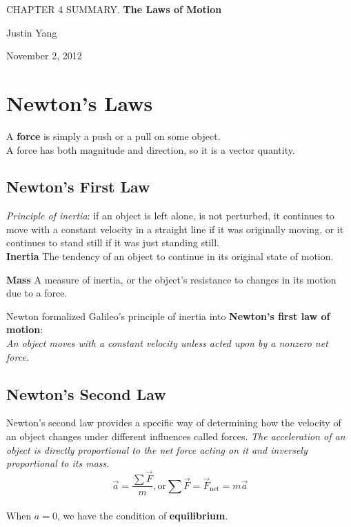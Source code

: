 \documentclass[11pt,a4paper]{report}
\begin{document}
\setcounter{secnumdepth}{0}
\begin{center}
\Large{CHAPTER 4 SUMMARY. \textbf{The Laws of Motion}}

\large{Justin Yang}

November 2, 2012
\end{center}

\section{Newton's Laws}
A \textbf{force} is simply a push or a pull on some object.\\A force has both magnitude and direction, so it is a vector quantity.

\subsection{Newton's First Law}
\textit{Principle of inertia}: if an object is left alone, is not perturbed, it continues to move with a constant velocity in a straight line if it was originally moving, or it continues to stand still if it was just standing still.
\\\textbf{Inertia} The tendency of an object to continue in its original state of motion.

\hspace{1mm}

\noindent
\textbf{Mass} A measure of inertia, or the object's resistance to changes in its motion due to a force.

\hspace{1mm}

\noindent
Newton formalized Galileo's principle of inertia into \textbf{Newton's first law of motion}:\\\emph{An object moves with a constant velocity unless acted upon by a nonzero net force.}

\subsection{Newton's Second Law}
Newton's second law provides a specific way of determining how the velocity of an object changes under different influences called forces.
\emph{The acceleration of an object is directly proportional to the net force acting on it and inversely proportional to its mass.}
$$\vec{a} = \frac{\sum \vec{F}}{m} \mathrm{, or } \sum{\vec{F}} = \vec{F}_\mathrm{net} = m \vec{a}$$
\\When $a = 0$, we have the condition of \textbf{equilibrium}.
\end{document}

